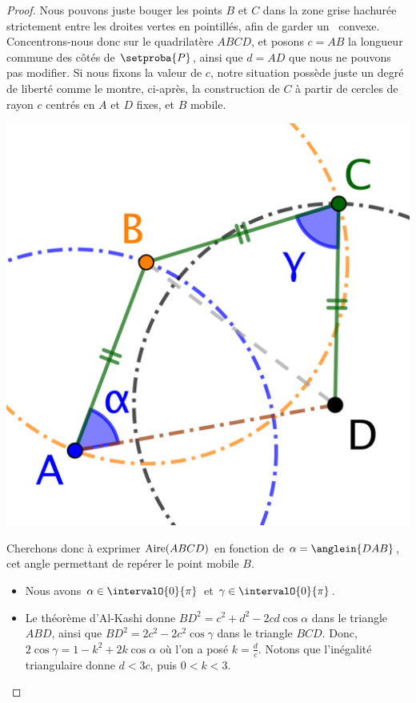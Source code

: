 \begin{proof}
	Nous pouvons juste bouger les points $B$ et $C$ dans la zone grise hachurée strictement entre les droites vertes en pointillés, afin de garder un \ngone\ convexe.
	Concentrons-nous donc sur le quadrilatère $ABCD$, et posons $c = AB$ la longueur commune des côtés de $\setproba{P}$, ainsi que $d = AD$ que nous ne pouvons pas modifier.
	Si nous fixons la valeur de $c$, notre situation possède juste un degré de liberté comme le montre, ci-après, la construction de $C$ à partir de cercles de rayon $c$ centrés en $A$ et $D$ fixes, et $B$ mobile.
	\begin{center}
		\includegraphics[scale=.4]{content/polygon/sol-must-be/2-eq-angles-circle.png}
	\end{center}
	
	Cherchons donc à exprimer $\mathrm{Aire}(ABCD)$ en fonction de $\alpha = \anglein{DAB}$, cet angle permettant de repérer le point mobile $B$.
	\begin{itemize}
	    \item Nous avons $\alpha \in \intervalO{0}{\pi}$ et $\gamma \in \intervalO{0}{\pi}$.


	    \item Le théorème d'Al-Kashi donne
	    $BD^2 = c^2 + d^2 - 2 c d \cos \alpha$ dans le triangle $ABD$,
	    ainsi que
	    $BD^2 = 2 c^2 - 2 c^2 \cos \gamma$ dans le triangle $BCD$.
	    Donc,
	    $2 \cos \gamma = 1 - k^2 + 2 k \cos \alpha$ où l'on a posé $k = \frac{d}{c}$.
	    Notons que l'inégalité triangulaire donne $d < 3 c$, puis $0 < k < 3$.



\end{itemize}
\end{proof}
